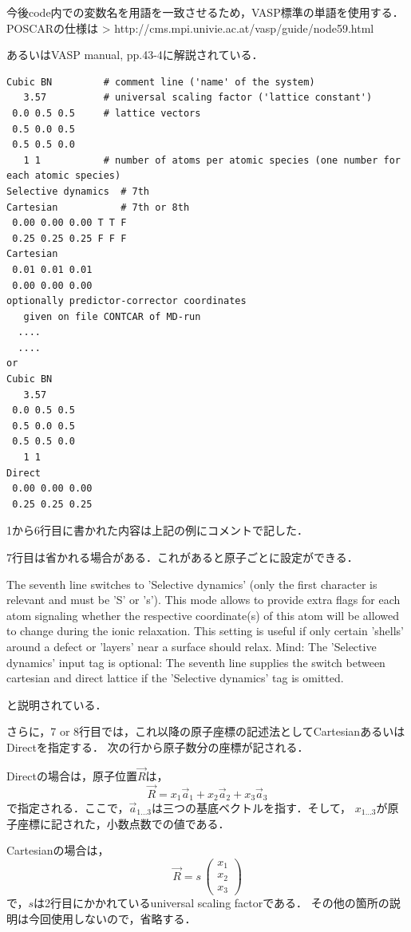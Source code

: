 今後code内での変数名を用語を一致させるため，VASP標準の単語を使用する．
POSCARの仕様は \textgreater{}
http://cms.mpi.univie.ac.at/vasp/guide/node59.html

あるいはVASP manual, pp.43-4に解説されている．

\begin{verbatim}
Cubic BN         # comment line ('name' of the system)
   3.57          # universal scaling factor ('lattice constant')
 0.0 0.5 0.5     # lattice vectors
 0.5 0.0 0.5  
 0.5 0.5 0.0
   1 1           # number of atoms per atomic species (one number for each atomic species)
Selective dynamics  # 7th
Cartesian           # 7th or 8th
 0.00 0.00 0.00 T T F
 0.25 0.25 0.25 F F F
Cartesian
 0.01 0.01 0.01
 0.00 0.00 0.00
optionally predictor-corrector coordinates 
   given on file CONTCAR of MD-run
  ....
  ....
or
Cubic BN
   3.57
 0.0 0.5 0.5
 0.5 0.0 0.5
 0.5 0.5 0.0
   1 1
Direct
 0.00 0.00 0.00 
 0.25 0.25 0.25
\end{verbatim}

1から6行目に書かれた内容は上記の例にコメントで記した．

7行目は省かれる場合がある．これがあると原子ごとに設定ができる．

The seventh line switches to 'Selective dynamics' (only the first
character is relevant and must be 'S' or 's'). This mode allows to
provide extra flags for each atom signaling whether the respective
coordinate(s) of this atom will be allowed to change during the ionic
relaxation. This setting is useful if only certain 'shells' around a
defect or 'layers' near a surface should relax. Mind: The 'Selective
dynamics' input tag is optional: The seventh line supplies the switch
between cartesian and direct lattice if the 'Selective dynamics' tag is
omitted.

と説明されている．

さらに，7 or
8行目では，これ以降の原子座標の記述法としてCartesianあるいはDirectを指定する．
次の行から原子数分の座標が記される．

Directの場合は，原子位置\(\overrightarrow{R}\)は， \[
\overrightarrow{R} = x_1 \overrightarrow{a}_1 +
x_2 \overrightarrow{a}_2 +
x_3 \overrightarrow{a}_3
\]
で指定される．ここで，\(\overrightarrow{a}_{1 \dots 3}\)は三つの基底ベクトルを指す．そして，
\(x_{1 \dots 3}\)が原子座標に記された，小数点数での値である．

Cartesianの場合は， \[
\overrightarrow{R} = s \,
\left(\begin{array}{cc}
x_1\\
x_2\\
x_3
\end{array}\right)
\] で，\(s\)は2行目にかかれているuniversal scaling factorである．
その他の箇所の説明は今回使用しないので，省略する．


